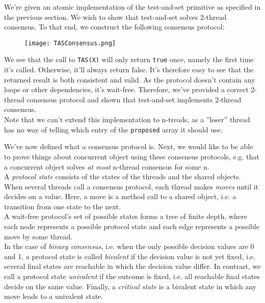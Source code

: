 \documentclass[main]{subfiles}
\begin{document}
\begin{example}
    We're given an atomic implementation of the test-and-set primitive as specified in the previous section. We wish to show that test-and-set solves 2-thread consensus. To that end, we construct the following consensus protocol:
    \begin{figure}[H]
        \centering
        \texttt{[image: TASConsensus.png]}
    \end{figure}
    We see that the call to \texttt{TAS(X)} will only return \texttt{true} once, namely the first time it's called. Otherwise, it'll always return false. It's therefore easy to see that the returned result is both consistent and valid. As the protocol doesn't contain any loops or other dependencies, it's wait-free. Therefore, we've provided a correct 2-thread consensus protocol and shown that test-and-set implements 2-thread consensus.\\[3mm]
    Note that we can't extend this implementation to n-treads, as a ''loser'' thread has no way of telling which entry of the \texttt{proposed} array it should use. 
\end{example}
We've now defined what a consensus protocol is. Next, we would like to be able to prove things about concurrent object using these consensus protocols, e.g. that a concurrent object solves \textit{at most} n-thread consensus for some n.\\[3mm]
A \textit{protocol state} consists of the states of the threads and the shared objects. When several threads call a consensus protocol, each thread makes \textit{moves} until it decides on a value. Here, a move is a method call to a shared object, i.e. a transition from one state to the next.\\
A wait-free protocol's set of possible states forms a tree of finite depth, where each node represents a possible protocol state and each edge represents a possible move by some thread.\\
In the case of \textit{binary consensus}, i.e. when the only possible decision values are 0 and 1, a protocol state is called \textit{bivalent} if the decision value is not yet fixed, i.e. several final states are reachable in which the decision value differ. In contrast, we call a protocol state \textit{univalent} if the outcome is fixed, i.e. all reachable final states decide on the same value. Finally, a \textit{critical state} is a bivalent state in which any move leads to a univalent state.
\end{document}
